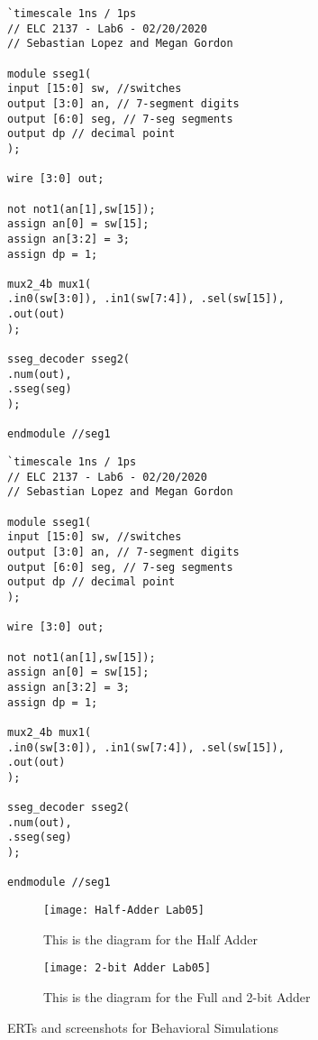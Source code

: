 \documentclass[11pt]{article}
\begin{document}
\begin{lstlisting}[style=Verilog,
caption=Sseg1 Source Code,
label=sseg1:ex
]
`timescale 1ns / 1ps
// ELC 2137 - Lab6 - 02/20/2020
// Sebastian Lopez and Megan Gordon

module sseg1(
input [15:0] sw, //switches 
output [3:0] an, // 7-segment digits
output [6:0] seg, // 7-seg segments
output dp // decimal point 
);

wire [3:0] out; 

not not1(an[1],sw[15]);
assign an[0] = sw[15];
assign an[3:2] = 3;
assign dp = 1; 

mux2_4b mux1(
.in0(sw[3:0]), .in1(sw[7:4]), .sel(sw[15]), 
.out(out) 
);

sseg_decoder sseg2(
.num(out),
.sseg(seg)
); 

endmodule //seg1
\end{lstlisting}

\begin{lstlisting}[style=Verilog,
caption=Sseg1 Test Bench Code,
label=sseg1_test:ex
]
`timescale 1ns / 1ps
// ELC 2137 - Lab6 - 02/20/2020
// Sebastian Lopez and Megan Gordon

module sseg1(
input [15:0] sw, //switches 
output [3:0] an, // 7-segment digits
output [6:0] seg, // 7-seg segments
output dp // decimal point 
);

wire [3:0] out; 

not not1(an[1],sw[15]);
assign an[0] = sw[15];
assign an[3:2] = 3;
assign dp = 1; 

mux2_4b mux1(
.in0(sw[3:0]), .in1(sw[7:4]), .sel(sw[15]), 
.out(out) 
);

sseg_decoder sseg2(
.num(out),
.sseg(seg)
); 

endmodule //seg1
\end{lstlisting}

\begin{figure}[ht]\centering
	\texttt{[image: Half-Adder Lab05]}
	\caption{This is the diagram for the Half Adder}
	\label{fig:Half-Adder}	
\end{figure}

\begin{figure}[ht]\centering
	\texttt{[image: 2-bit Adder Lab05]}
	\caption{This is the diagram for the Full and 2-bit Adder}
	\label{fig:Full_2-bit_Adder}	
\end{figure}

	\item ERTs and screenshots for Behavioral Simulations 
	
\end{document}
